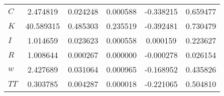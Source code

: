 \begin{center}
\begin{longtable}{lccccc}
$C         $	 & 	        2.474819	 & 	        0.024248	 & 	        0.000588	 & 	       -0.338215	 & 	        0.659477 \\ 
$K         $	 & 	       40.589315	 & 	        0.485303	 & 	        0.235519	 & 	       -0.392481	 & 	        0.730479 \\ 
$I         $	 & 	        1.014659	 & 	        0.023623	 & 	        0.000558	 & 	        0.000159	 & 	        0.223627 \\ 
$R         $	 & 	        1.008644	 & 	        0.000267	 & 	        0.000000	 & 	       -0.000278	 & 	        0.026154 \\ 
$w         $	 & 	        2.427689	 & 	        0.031064	 & 	        0.000965	 & 	       -0.168952	 & 	        0.435826 \\ 
$TT        $	 & 	        0.303785	 & 	        0.004287	 & 	        0.000018	 & 	       -0.221065	 & 	        0.504810 \\ 
\end{longtable}
 \end{center}
